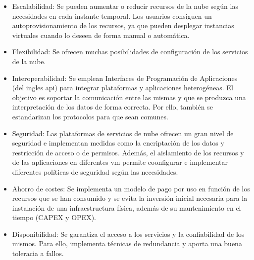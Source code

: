 \begin{itemize}
  \item Escalabilidad: Se pueden aumentar o reducir recursos de la nube según las necesidades en cada instante temporal. Los usuarios consiguen un autoprovisionamiento de los recursos, ya que pueden desplegar instancias virtuales cuando lo deseen de forma manual o automática.
  \item Flexibilidad: Se ofrecen muchas posibilidades de configuración de los servicios de la nube.
  \item Interoperabilidad: Se emplean Interfaces de Programación de Aplicaciones (del ingles \gls{api}) para integrar plataformas y aplicaciones heterogéneas. El objetivo es soportar la comunicación entre las mismas y que se produzca una interpretación de los datos de forma correcta. Por ello, también se estandarizan los protocolos para que sean comunes. 
  \item Seguridad: Las plataformas de servicios de nube ofrecen un gran nivel de seguridad e implementan medidas como la encriptación de los datos y restricción de acceso o de permisos. Además, el aislamiento de los recursos y de las aplicaciones en diferentes \gls{vm} permite coonfigurar e implementar diferentes políticas de seguridad según las necesidades.
  \item Ahorro de costes: Se implementa un modelo de pago por uso en función de los recursos que se han consumido y se evita la inversión inicial necesaria para la instalación de una infraestructura física, además de su mantenimiento en el tiempo (CAPEX y OPEX).
  \item Disponibilidad: Se garantiza el acceso a los servicios y la confiabilidad de los mismos. Para ello, implementa técnicas de redundancia y aporta una buena toleracia a fallos.
\end{itemize}









\vspace{3mm}













